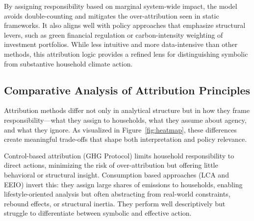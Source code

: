 \documentclass[12pt,a4paper]{article}%
\begin{document}
By assigning responsibility based on marginal system-wide impact, the model avoids double-counting and mitigates the over-attribution seen in static frameworks. It also aligns well with policy approaches that emphasize structural levers, such as green financial regulation or carbon-intensity weighting of investment portfolios. While less intuitive and more data-intensive than other methods, this attribution logic provides a refined lens for distinguishing symbolic from substantive household climate action.

\subsection{Comparative Analysis of Attribution Principles}

Attribution methods differ not only in analytical structure but in how they frame responsibility—what they assign to households, what they assume about agency, and what they ignore. As visualized in Figure~\ref{fig:heatmap}, these differences create meaningful trade-offs that shape both interpretation and policy relevance.

Control-based attribution (GHG Protocol) limits household responsibility to direct actions, minimizing the risk of over-attribution but offering little behavioral or structural insight. Consumption based approaches (LCA and EEIO) invert this: they assign large shares of emissions to households, enabling lifestyle-oriented analysis but often abstracting from real-world constraints, rebound effects, or structural inertia. They perform well descriptively but struggle to differentiate between symbolic and effective action.
\end{document}
